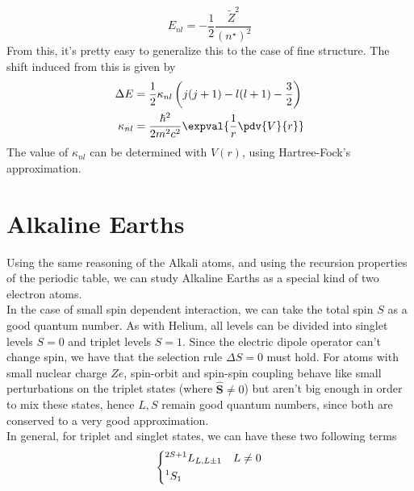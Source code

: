 \documentclass[a4paper, 11pt]{book}
\renewcommand{\vec}[1]{\mathbf{#1}}
\newcommand{\1}{\opr{\mathds{1}}}
\newcommand{\opr}[1]{\hat{#1}}
\newcommand{\vecopr}[1]{\opr{\vec{#1}}}
\newcommand{\term}[3][]{^{#3}#2_{#1}}
\theoremstyle{plain}
\begin{document}
	\begin{equation}
		E_{nl}=-\frac{1}{2}\frac{\tilde{Z}^2}{(n^{\star})^2}
		\label{eq:spectrumemissionalkali}
	\end{equation}
	From this, it's pretty easy to generalize this to the case of fine structure. The shift induced from this is given by
	\begin{equation}
		\begin{aligned}
			\Delta E&=\frac{1}{2}\kappa_{nl}\left( j(j+1)-l(l+1)-\frac{3}{2} \right)\\
			\kappa_{nl}&=\frac{\hbar^2}{2m^2c^2}\expval{\frac{1}{r}\pdv{V}{r}}
		\end{aligned}
		\label{eq:finestructureshiftalkali}
	\end{equation}
	The value of $\kappa_{nl}$ can be determined with $V(r)$, using Hartree-Fock's approximation.
	\section{Alkaline Earths}
	Using the same reasoning of the Alkali atoms, and using the recursion properties of the periodic table, we can study Alkaline Earths as a special kind of two electron atoms.\\
	In the case of small spin dependent interaction, we can take the total spin $S$ as a good quantum number. As with Helium, all levels can be divided into singlet levels $S=0$ and triplet levels $S=1$. Since the electric dipole operator can't change spin, we have that the selection rule $\Delta S=0$ must hold. For atoms with small nuclear charge $Ze$, spin-orbit and spin-spin coupling behave like small perturbations on the triplet states (where $\vecopr{S}\ne0$) but aren't big enough in order to mix these states, hence $L,S$ remain good quantum numbers, since both are conserved to a very good approximation.\\
	In general, for triplet and singlet states, we can have these two following terms
	\begin{equation}
		\begin{dcases}
			\term[L,L\pm1]{L}{2S+1}&L\ne0\\
			\term[1]{S}{1}
		\end{dcases}
		\label{eq:possibletermsalkaliearths}
	\end{equation}
\end{document}
